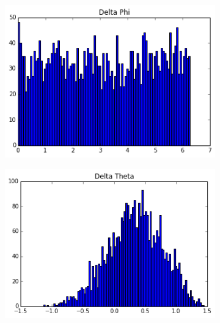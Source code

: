 \begin{figure}[t]
    \centering
    \begin{subfigure}{0.3\textwidth}
        \centering
        \includegraphics[width=\textwidth]{images/deltaphi}
        \subcaption{}
        \label{subfig:robust-deltaphi}
    \end{subfigure}
    \;
    \begin{subfigure}{0.3\textwidth}
        \centering
        \includegraphics[width=\textwidth]{images/deltatheta}
        \subcaption{}
        \label{subfig:robust-deltatheta}
    \end{subfigure}
    \;
    \begin{subfigure}{0.3\textwidth}
        \centering

\end{subfigure}
\end{figure}
